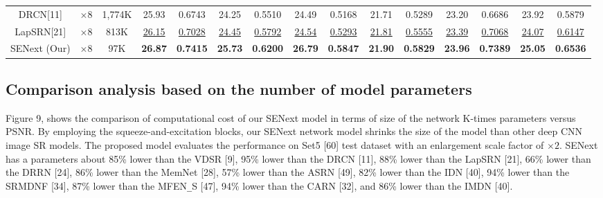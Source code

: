 \documentclass{ieeeaccess}
\begin{document}
\begin{table}
\begin{tabular}{|c|c|c|cc|cc|cc|cc|cc|cc|}
DRCN[11]& $\times8$&1,774K& \multicolumn{1}{c|}{25.93} &  0.6743 & \multicolumn{1}{c|}{24.25} & 0.5510&\multicolumn{1}{c|}{24.49} & 0.5168 & \multicolumn{1}{c|}{21.71  } &0.5289 & \multicolumn{1}{c|}{23.20 } &0.6686
&\multicolumn{1}{c|}{23.92  } &  0.5879       \\


LapSRN[21] & $\times8$&813K& \multicolumn{1}{c|}{\color{blue}\underline{26.15}} &{\color{blue}\underline{0.7028}}   & \multicolumn{1}{c|}{\color{blue}\underline{24.45}} &{\color{blue}\underline{0.5792}}   &\multicolumn{1}{c|}{\color{blue}\underline{24.54}} &{\color{blue}\underline{0.5293}}   & \multicolumn{1}{c|}{\color{blue}\underline{21.81}} &{\color{blue}\underline{0.5555}} & \multicolumn{1}{c|}{\color{blue}\underline{23.39}}  &{\color{blue}\underline{0.7068}} &\multicolumn{1}{c|}{\color{blue}\underline{24.07}} &{\color{blue}\underline{0.6147}} \\



SENext (Our) & $\times8$ &97K& \multicolumn{1}{c|}{\color{red}\textbf{26.87}} &{\color{red}\textbf{0.7415}} & \multicolumn{1}{c|}{\color{red}\textbf{25.73}} &{\color{red}\textbf{0.6200}} & \multicolumn{1}{c|}{\color{red}\textbf{26.79}} &{\color{red}\textbf{0.5847}} & \multicolumn{1}{c|}{\color{red}\textbf{21.90}} &{\color{red}\textbf{0.5829}} & \multicolumn{1}{c|}{\color{red}\textbf{23.96}} &{\color{red}\textbf{0.7389}} &\multicolumn{1}{c|}{\color{red}\textbf{25.05}} &{\color{red}\textbf{0.6536}}  \\

\hline


\end{tabular}
\end{table}



\subsection{Comparison analysis based on the number of model parameters}
Figure 9, shows the comparison of computational cost of our SENext model in terms of size of the network K-times parameters versus PSNR. By employing the squeeze-and-excitation blocks, our SENext network model shrinks the size of the model than other deep CNN image SR models. The proposed model evaluates the performance on Set5 [60] test dataset with an enlargement scale factor of $\times 2$. SENext has a parameters about 85\% lower than the VDSR [9], 95\% lower than the DRCN [11], 88\% lower than the LapSRN [21], 66\% lower than the DRRN [24], 86\% lower than the MemNet [28],  57\% lower than the ASRN [49], 82\% lower than the IDN [40], 94\% lower than the SRMDNF [34], 87\% lower than the MFEN\texttt{\_}S [47], 94\% lower than the CARN [32], and 86\% lower than the IMDN [40].
\end{document}
